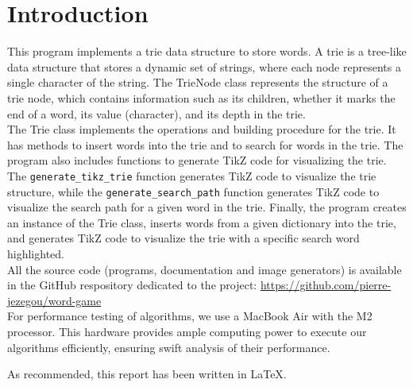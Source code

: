 \documentclass[10pt,a4paper,hidelinks]{article}
\begin{document}

\tableofcontents

\section{Introduction}
This program implements a trie data structure to store words.
A trie is a tree-like data structure that stores a dynamic set of strings, where each node represents a single character of the string.
The TrieNode class represents the structure of a trie node, which contains information such as its children, whether it marks the end of a word, its value (character), and its depth in the trie.\\

The Trie class implements the operations and building procedure for the trie. It has methods to insert words into the trie and to search for words in the trie.
The program also includes functions to generate TikZ code for visualizing the trie. The \verb|generate_tikz_trie| function generates TikZ code to visualize the trie structure, while the \verb|generate_search_path| function generates TikZ code to visualize the search path for a given word in the trie.
Finally, the program creates an instance of the Trie class, inserts words from a given dictionary into the trie, and generates TikZ code to visualize the trie with a specific search word highlighted.\\

All the source code (programs, documentation and image generators) is available in the GitHub respository dedicated to the project: \url{https://github.com/pierre-jezegou/word-game}\\

For performance testing of algorithms, we use a MacBook Air with the M2 processor. This hardware provides ample computing power to execute our algorithms efficiently, ensuring swift analysis of their performance.

As recommended, this report has been written in \LaTeX.
\end{document}
